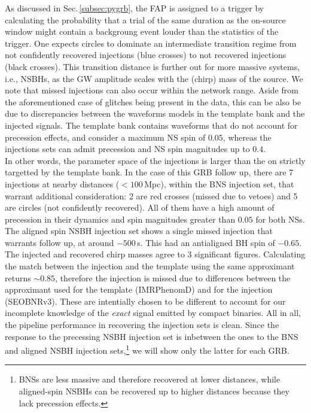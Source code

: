 \documentclass[binding=0.6cm, LaM]{sapthesis}
\begin{document}
	As discussed in Sec.\,\ref{subsec:pygrb}, the FAP is assigned to a trigger 
	by calculating the probability that a trial of the same duration as the on-source window 
	might contain a backgroung event louder than the statistics of the trigger.
        One expects circles to dominate an intermediate transition regime from 
	not confidently recovered injections (blue crosses) to not recovered injections (black crosses).  
	This transition distance is further out for more massive systems, i.e., NSBHs, 
	as the GW amplitude scales with the (chirp) mass of the source. 
	We note that missed injections can also occur within the network range.  
	Aside from the aforementioned case of glitches being present in the data, 
	this can be also be due to discrepancies between 
	the waveforms models in the template bank and the injected signals. 
	The template bank contains waveforms that do not account for precession effects, 
	and consider a maximum NS spin of $0.05$, whereas the injections sets can admit 
	precession and NS spin magnitudes up to $0.4$.  \\
	In other words, the parameter space of the injections is larger 
	than the on strictly targetted by the template bank.
	In the case of this GRB follow up, there are 7 injections at nearby distances ($<100\,$Mpc), 
	within the BNS injection set, that warrant additional consideration: 
        2 are red crosses (missed due to vetoes) and 5 are circles (not confidently recovered).
	All of them have a high amount of precession in their dynamics and spin magnitudes greater than $0.05$ for both NSs.
	The aligned spin NSBH injection set shows a single missed injection that warrants follow up, 
	at around $-500\,$s.
	This had an antialigned BH spin of $-0.65$. 
	The injected and recovered chirp masses agree to 3 significant figures. 
	Calculating the match between the injection and the template using the same approximant returns $\sim 0.85$, 
	therefore the injection is missed due to differences between the approximant 
	used for the template (IMRPhenomD) and for the injection (SEOBNRv3).  
	These are intentially chosen to be different to account for our incomplete knowledge 
	of the \emph{exact} signal emitted by compact binaries.
        All in all, the pipeline performance in recovering the injection sets is clean.  
	Since the response to the precessing NSBH injection set is inbetween the ones to the BNS and aligned NSBH injection sets,\footnote{BNSs are less massive and therefore recovered at lower distances, while aligned-spin NSBHs can be recovered up to higher distances because they lack precession effects.}
	we will show only the latter for each GRB.	
\end{document}
